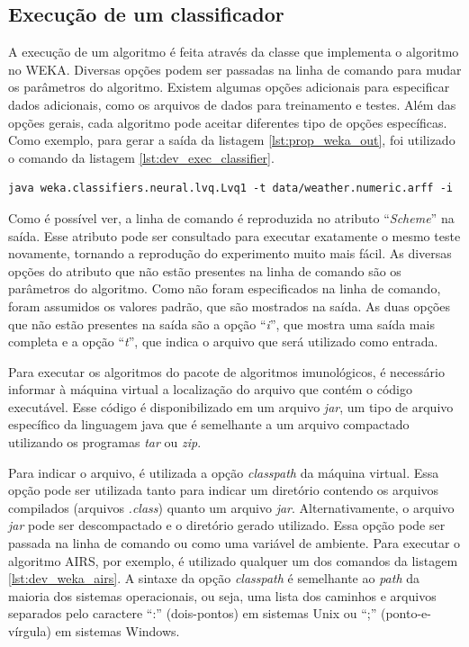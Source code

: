 \subsection{Execução de um classificador}

A execução de um algoritmo é feita através da classe que implementa o algoritmo no WEKA. Diversas opções podem ser passadas na linha de comando para mudar os parâmetros do algoritmo. Existem algumas opções adicionais para especificar dados adicionais, como os arquivos de dados para treinamento e testes. Além das opções gerais, cada algoritmo pode aceitar diferentes tipo de opções específicas. Como exemplo, para gerar a saída da listagem \ref{lst:prop_weka_out}, foi utilizado o comando da listagem \ref{lst:dev_exec_classifier}.

\vspace{0.5cm}
\begin{lstlisting}[caption=Execução de um classificador, label=lst:dev_exec_classifier]
java weka.classifiers.neural.lvq.Lvq1 -t data/weather.numeric.arff -i
\end{lstlisting}
\vspace{0.5cm}

Como é possível ver, a linha de comando é reproduzida no atributo ``\emph{Scheme}'' na saída. Esse atributo pode ser consultado para executar exatamente o mesmo teste novamente, tornando a reprodução do experimento muito mais fácil. As diversas opções do atributo que não estão presentes na linha de comando são os parâmetros do algoritmo. Como não foram especificados na linha de comando, foram assumidos os valores padrão, que são mostrados na saída. As duas opções que não estão presentes na saída são a opção ``\emph{i}'', que mostra uma saída mais completa e a opção ``\emph{t}'', que indica o arquivo que será utilizado como entrada.

Para executar os algoritmos do pacote de algoritmos imunológicos, é necessário informar à máquina virtual a localização do arquivo que contém o código executável. Esse código é disponibilizado em um arquivo \emph{jar}, um tipo de arquivo específico da linguagem java que é semelhante a um arquivo compactado utilizando os programas \emph{tar} ou \emph{zip}.

Para indicar o arquivo, é utilizada a opção \emph{classpath} da máquina virtual. Essa opção pode ser utilizada tanto para indicar um diretório contendo os arquivos compilados (arquivos \emph{.class}) quanto um arquivo \emph{jar}. Alternativamente, o arquivo \emph{jar} pode ser descompactado e o diretório gerado utilizado. Essa opção pode ser passada na linha de comando ou como uma variável de ambiente. Para executar o algoritmo AIRS, por exemplo, é utilizado qualquer um dos comandos da listagem \ref{lst:dev_weka_airs}. A sintaxe da opção \emph{classpath} é semelhante ao \emph{path} da maioria dos sistemas operacionais, ou seja, uma lista dos caminhos e arquivos separados pelo caractere ``:'' (dois-pontos) em sistemas Unix ou ``;'' (ponto-e-vírgula) em sistemas Windows.

